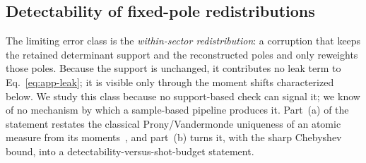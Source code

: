 \documentclass[submission, PhysCore]{SciPost}
\begin{document}
\subsection{Detectability of fixed-pole redistributions}
The limiting error class is the \emph{within-sector redistribution}: a corruption that keeps the retained determinant support and the reconstructed poles and only reweights those poles. Because the support is unchanged, it contributes no leak term to Eq.~\eqref{eq:app-leak}; it is visible only through the moment shifts characterized below. We study this class because no support-based check can signal it; we know of no mechanism by which a sample-based pipeline produces it. Part~(a) of the statement restates the classical Prony/Vandermonde uniqueness of an atomic measure from its moments~\cite{ShohatTamarkin1943,PottsTasche2013}, and part~(b) turns it, with the sharp Chebyshev bound, into a detectability-versus-shot-budget statement.
\end{document}
